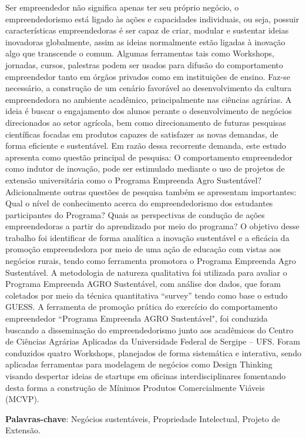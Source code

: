 \setlength{\absparsep}{18pt} %
\begin{resumo}


Ser empreendedor não significa apenas ter seu próprio negócio, o empreendedorismo está ligado às ações e capacidades individuais, ou seja, possuir características empreendedoras é ser capaz de criar, modular e sustentar ideias inovadoras globalmente, assim as ideias normalmente estão ligadas à inovação algo que transcende o comum. Algumas ferramentas tais como Workshops, jornadas, cursos, palestras podem ser usados para difusão do comportamento empreendedor tanto em órgãos privados como em instituições de ensino. Faz-se necessário, a construção de um cenário favorável ao desenvolvimento da cultura empreendedora no ambiente acadêmico, principalmente nas ciências agrárias. A ideia é buscar o engajamento dos alunos perante o desenvolvimento de negócios direcionados ao setor agrícola, bem como direcionamento de futuras pesquisas científicas focadas em produtos capazes de satisfazer as novas demandas, de forma eficiente e sustentável. Em razão dessa recorrente demanda, este estudo apresenta como questão principal de pesquisa: O comportamento empreendedor como indutor de inovação, pode ser estimulado mediante o uso de projetos de extensão universitária como o Programa Empreenda Agro Sustentável? Adicionalmente outras questões de pesquisa também se apresentam importantes: Qual o nível de conhecimento acerca do empreendedorismo dos estudantes participantes do Programa? Quais as perspectivas de condução de ações empreendedoras a partir do aprendizado por meio do programa? O objetivo desse trabalho foi identificar de forma analítica a inovação sustentável e a eficácia da promoção empreendedora por meio de uma ação de educação com vistas aos negócios rurais, tendo como ferramenta promotora o Programa Empreenda Agro Sustentável. A metodologia de natureza qualitativa foi utilizada para avaliar o Programa Empreenda AGRO
Sustentável, com análise dos dados, que foram coletados por meio da técnica quantitativa 
“survey” tendo como base o estudo GUESS. A ferramenta de promoção prática do exercício do comportamento empreendedor “Programa Empreenda AGRO Sustentável", foi conduzida buscando a disseminação do empreendedorismo junto aos acadêmicos do Centro de Ciências Agrárias Aplicadas da Universidade Federal de Sergipe – UFS. Foram conduzidos quatro Workshops, planejados de forma sistemática e interativa, sendo aplicadas ferramentas para modelagem de negócios como Design Thinking visando despertar ideias de startups em oficinas interdisciplinares fomentando desta forma a construção de Mínimos Produtos Comercialmente Viáveis (MCVP).


 \textbf{Palavras-chave}: Negócios sustentáveis, Propriedade Intelectual, Projeto de Extensão.
\end{resumo}